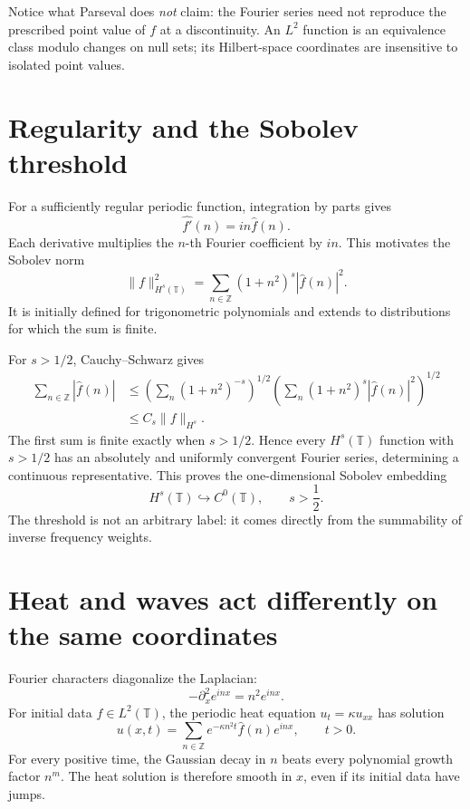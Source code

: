Notice what Parseval does \emph{not} claim: the Fourier series need not reproduce the prescribed point value of \(f\) at a discontinuity. An \(L^2\) function is an equivalence class modulo changes on null sets; its Hilbert-space coordinates are insensitive to isolated point values.

\section{Regularity and the Sobolev threshold}

For a sufficiently regular periodic function, integration by parts gives
\[
 \widehat{f'}(n)=in\widehat f(n).
\]
Each derivative multiplies the \(n\)-th Fourier coefficient by \(in\). This motivates the Sobolev norm
\[
 \boxed{\|f\|_{H^s(\mathbb T)}^2
 =\sum_{n\in\mathbb Z}(1+n^2)^s|\widehat f(n)|^2.}
\]
It is initially defined for trigonometric polynomials and extends to distributions for which the sum is finite.

For \(s>1/2\), Cauchy--Schwarz gives
\[
\begin{aligned}
 \sum_{n\in\mathbb Z}|\widehat f(n)|
 &\le
 \left(\sum_n(1+n^2)^{-s}\right)^{1/2}
 \left(\sum_n(1+n^2)^s|\widehat f(n)|^2\right)^{1/2}\\
 &\le C_s\|f\|_{H^s}.
\end{aligned}
\]
The first sum is finite exactly when \(s>1/2\). Hence every \(H^s(\mathbb T)\) function with \(s>1/2\) has an absolutely and uniformly convergent Fourier series, determining a continuous representative. This proves the one-dimensional Sobolev embedding
\[
 H^s(\mathbb T)\hookrightarrow C^0(\mathbb T),
 \qquad s>\frac12.
\]
The threshold is not an arbitrary label: it comes directly from the summability of inverse frequency weights.

\section{Heat and waves act differently on the same coordinates}

Fourier characters diagonalize the Laplacian:
\[
 -\partial_x^2 e^{inx}=n^2e^{inx}.
\]
For initial data \(f\in L^2(\mathbb T)\), the periodic heat equation
\(u_t=\kappa u_{xx}\) has solution
\[
 \boxed{u(x,t)=\sum_{n\in\mathbb Z}
  e^{-\kappa n^2t}\widehat f(n)e^{inx}},
 \qquad t>0.
\]
For every positive time, the Gaussian decay in \(n\) beats every polynomial growth factor \(n^m\). The heat solution is therefore smooth in \(x\), even if its initial data have jumps.

